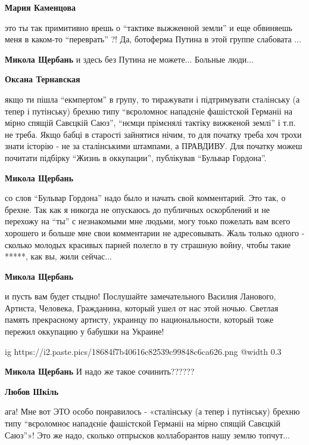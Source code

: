 \begin{itemize}
\begin{itemize}
\begin{itemize} %
\textbf{Мария Каменцова} 

это ты так примитивно врешь о \enquote{тактике выжженной земли} и еще обвиняешь меня в
каком-то \enquote{переврать} ?! Да, ботоферма Путина в этой группе слабовата ...


\textbf{Микола Щербань} и здесь без Путина не можете... Больные люди...

\textbf{Оксана Тернавская} 

якщо ти пішла \enquote{екмпертом} в групу, то тиражувати і підтримувати сталінську (а
тепер і путінську) брехню типу \enquote{вєроломноє нападєніе фашістской Германіі на
мірно спящій Савєцкій Саюз}, \enquote{нємци прімєнялі тактіку вижженой землі} і т.п.
не треба. Якщо бабці в старості зайнятися нічим, то для початку треба хоч трохи
знати історію - не за сталінськими штампами, а ПРАВДИВУ. Для початку можеш
почитати підбірку \enquote{Жизнь в оккупации}, публікував \enquote{Бульвар Гордона}.

\textbf{Микола Щербань} 

со слов \enquote{Бульвар Гордона} надо было и начать свой комментарий. Это так, о
брехне. Так как я никогда не опускаюсь до публичных оскорблений и не перехожу
на \enquote{ты} с незнакомыми мне людьми, могу тоько пожелать вам всего хорошего и
больше мне свои комментарии не адресовывать. Жаль только одного - сколько
молодых красивых парней полегло в ту страшную войну, чтобы такие *****, как вы,
жили сейчас...

\textbf{Микола Щербань} 

и пусть вам будет стыдно! Послушайте замечательного Василия Ланового, Артиста,
Человека, Гражданина, который ушел от нас этой ночью. Светлая память
прекрасному артисту, украинцу по национальности, который тоже пережил оккупацию
у бабушки на Украине!

\ifcmt
  ig https://i2.paste.pics/18684f7b40616c82539c99848c6ca626.png
  @width 0.3
\fi

\textbf{Микола Щербань} И надо же такое сочинить??????

\textbf{Любов Шкіль} 

ага! Мне вот ЭТО особо понравилось - «сталінську (а тепер і путінську) брехню
типу \enquote{вєроломноє нападєніе фашістской Германіі на мірно спящій Савєцкій Саюз}»!
Это же надо, сколько отпрысков коллаборантов нашу землю топчут...


\end{itemize}
\end{itemize}
\end{itemize}
